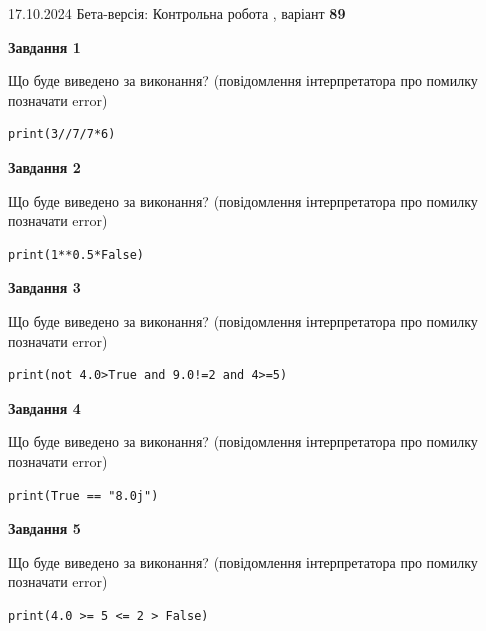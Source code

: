 \documentclass[12pt, ukrainian]{article}
\begin{document}
{\Large{17.10.2024 Бета-версія: Контрольна робота , варіант  \No \textbf { 89 }\par}}
{
\begin {large}
{\begin {center}\textbf{Завдання 1}\end {center}}

Що буде виведено за виконання? (повідомлення інтерпретатора про помилку позначати error)\par
\begin{verbatim}
print(3//7/7*6)
\end{verbatim}

{\begin {center}\textbf{Завдання 2}\end {center}}

Що буде виведено за виконання? (повідомлення інтерпретатора про помилку позначати error)\par
\begin{verbatim}
print(1**0.5*False)
\end{verbatim}

{\begin {center}\textbf{Завдання 3}\end {center}}

Що буде виведено за виконання? (повідомлення інтерпретатора про помилку позначати error)\par
\begin{verbatim}
print(not 4.0>True and 9.0!=2 and 4>=5)
\end{verbatim}

{\begin {center}\textbf{Завдання 4}\end {center}}

Що буде виведено за виконання? (повідомлення інтерпретатора про помилку позначати error)\par
\begin{verbatim}
print(True == "8.0j")
\end{verbatim}

{\begin {center}\textbf{Завдання 5}\end {center}}

Що буде виведено за виконання? (повідомлення інтерпретатора про помилку позначати error)\par
\begin{verbatim}
print(4.0 >= 5 <= 2 > False)
\end{verbatim}


\end{large}}
\end{document}
